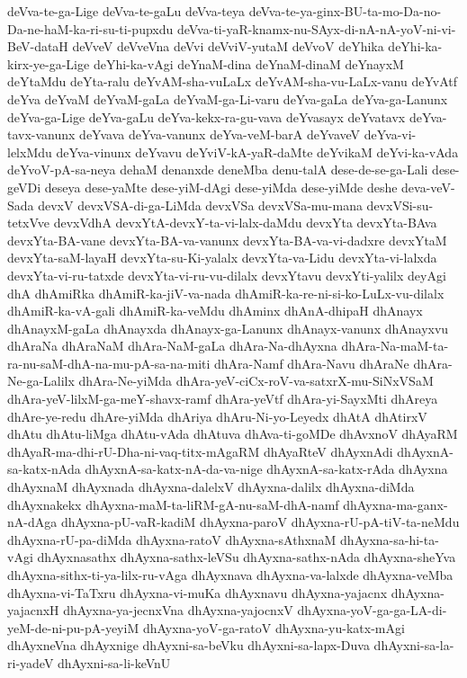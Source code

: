 {deVva-te-ga-Lige
deVva-te-gaLu
deVva-teya
deVva-te-ya-ginx-BU-ta-mo-Da-no-Da-ne-haM-ka-ri-su-ti-pupxdu
deVva-ti-yaR-knamx-nu-SAyx-di-nA-nA-yoV-ni-vi-BeV-dataH
deVveV
deVveVna
deVvi
deVviV-yutaM
deVvoV
deYhika
deYhi-ka-kirx-ye-ga-Lige
deYhi-ka-vAgi
deYnaM-dina
deYnaM-dinaM
deYnayxM
deYtaMdu
deYta-ralu
deYvAM-sha-vuLaLx
deYvAM-sha-vu-LaLx-vanu
deYvAtf
deYva
deYvaM
deYvaM-gaLa
deYvaM-ga-Li-varu
deYva-gaLa
deYva-ga-Lanunx
deYva-ga-Lige
deYva-gaLu
deYva-kekx-ra-gu-vava
deYvasayx
deYvatavx
deYva-tavx-vanunx
deYvava
deYva-vanunx
deYva-veM-barA
deYvaveV
deYva-vi-lelxMdu
deYva-vinunx
deYvavu
deYviV-kA-yaR-daMte
deYvikaM
deYvi-ka-vAda
deYvoV-pA-sa-neya
dehaM
denanxde
deneMba
denu-talA
dese-de-se-ga-Lali
dese-geVDi
deseya
dese-yaMte
dese-yiM-dAgi
dese-yiMda
dese-yiMde
deshe
deva-veV-Sada
devxV
devxVSA-di-ga-LiMda
devxVSa
devxVSa-mu-mana
devxVSi-su-tetxVve
devxVdhA
devxYtA-devxY-ta-vi-lalx-daMdu
devxYta
devxYta-BAva
devxYta-BA-vane
devxYta-BA-va-vanunx
devxYta-BA-va-vi-dadxre
devxYtaM
devxYta-saM-layaH
devxYta-su-Ki-yalalx
devxYta-va-Lidu
devxYta-vi-lalxda
devxYta-vi-ru-tatxde
devxYta-vi-ru-vu-dilalx
devxYtavu
devxYti-yalilx
deyAgi
dhA
dhAmiRka
dhAmiR-ka-jiV-va-nada
dhAmiR-ka-re-ni-si-ko-LuLx-vu-dilalx
dhAmiR-ka-vA-gali
dhAmiR-ka-veMdu
dhAminx
dhAnA-dhipaH
dhAnayx
dhAnayxM-gaLa
dhAnayxda
dhAnayx-ga-Lanunx
dhAnayx-vanunx
dhAnayxvu
dhAraNa
dhAraNaM
dhAra-NaM-gaLa
dhAra-Na-dhAyxna
dhAra-Na-maM-ta-ra-nu-saM-dhA-na-mu-pA-sa-na-miti
dhAra-Namf
dhAra-Navu
dhAraNe
dhAra-Ne-ga-Lalilx
dhAra-Ne-yiMda
dhAra-yeV-ciCx-roV-va-satxrX-mu-SiNxVSaM
dhAra-yeV-lilxM-ga-meY-shavx-ramf
dhAra-yeVtf
dhAra-yi-SayxMti
dhAreya
dhAre-ye-redu
dhAre-yiMda
dhAriya
dhAru-Ni-yo-Leyedx
dhAtA
dhAtirxV
dhAtu
dhAtu-liMga
dhAtu-vAda
dhAtuva
dhAva-ti-goMDe
dhAvxnoV
dhAyaRM
dhAyaR-ma-dhi-rU-Dha-ni-vaq-titx-mAgaRM
dhAyaRteV
dhAyxnAdi
dhAyxnA-sa-katx-nAda
dhAyxnA-sa-katx-nA-da-va-nige
dhAyxnA-sa-katx-rAda
dhAyxna
dhAyxnaM
dhAyxnada
dhAyxna-dalelxV
dhAyxna-dalilx
dhAyxna-diMda
dhAyxnakekx
dhAyxna-maM-ta-liRM-gA-nu-saM-dhA-namf
dhAyxna-ma-ganx-nA-dAga
dhAyxna-pU-vaR-kadiM
dhAyxna-paroV
dhAyxna-rU-pA-tiV-ta-neMdu
dhAyxna-rU-pa-diMda
dhAyxna-ratoV
dhAyxna-sAthxnaM
dhAyxna-sa-hi-ta-vAgi
dhAyxnasathx
dhAyxna-sathx-leVSu
dhAyxna-sathx-nAda
dhAyxna-sheYva
dhAyxna-sithx-ti-ya-lilx-ru-vAga
dhAyxnava
dhAyxna-va-lalxde
dhAyxna-veMba
dhAyxna-vi-TaTxru
dhAyxna-vi-muKa
dhAyxnavu
dhAyxna-yajacnx
dhAyxna-yajacnxH
dhAyxna-ya-jecnxVna
dhAyxna-yajocnxV
dhAyxna-yoV-ga-ga-LA-di-yeM-de-ni-pu-pA-yeyiM
dhAyxna-yoV-ga-ratoV
dhAyxna-yu-katx-mAgi
dhAyxneVna
dhAyxnige
dhAyxni-sa-beVku
dhAyxni-sa-lapx-Duva
dhAyxni-sa-la-ri-yadeV
dhAyxni-sa-li-keVnU
}
